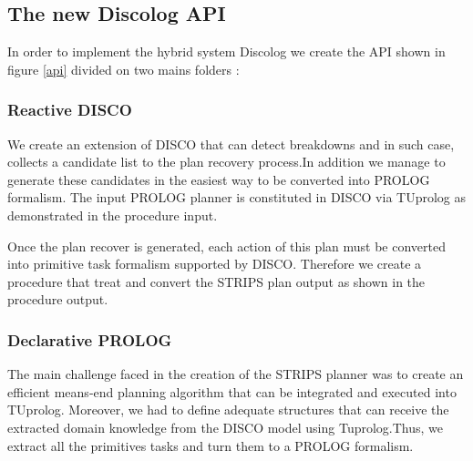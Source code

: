 \subsection{The new Discolog API}
In order to implement the hybrid system Discolog we create the API shown in  figure \ref*{api} divided on two mains folders :
\subsubsection{Reactive DISCO }
We create an extension of DISCO that can detect breakdowns and in such case, collects a candidate list to the plan recovery process.In addition we manage to generate these candidates in the easiest way to be converted into PROLOG formalism. The input PROLOG planner is constituted in DISCO via TUprolog as demonstrated in the procedure input.


 Once the plan recover is generated, each action of this plan must be converted into primitive task formalism supported by DISCO. Therefore we create a procedure that treat and convert the STRIPS plan output as shown in the procedure output. 


\subsubsection{ Declarative PROLOG }
The main challenge faced in the creation of the STRIPS planner was to create an efficient means-end planning algorithm that can be integrated and executed  into TUprolog. Moreover, we had to define adequate structures that can receive the extracted domain knowledge  from the DISCO model using Tuprolog.Thus, we extract all the primitives tasks and turn them to a PROLOG formalism. 
 

